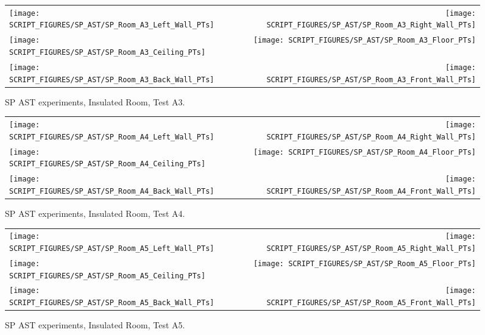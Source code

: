 \begin{figure}[p]
\begin{tabular*}{\textwidth}{l@{\extracolsep{\fill}}r}
\texttt{[image: SCRIPT\_FIGURES/SP\_AST/SP\_Room\_A3\_Left\_Wall\_PTs]} &  \texttt{[image: SCRIPT\_FIGURES/SP\_AST/SP\_Room\_A3\_Right\_Wall\_PTs]}  \\
\texttt{[image: SCRIPT\_FIGURES/SP\_AST/SP\_Room\_A3\_Ceiling\_PTs]}   &  \texttt{[image: SCRIPT\_FIGURES/SP\_AST/SP\_Room\_A3\_Floor\_PTs]}  \\
\texttt{[image: SCRIPT\_FIGURES/SP\_AST/SP\_Room\_A3\_Back\_Wall\_PTs]} &  \texttt{[image: SCRIPT\_FIGURES/SP\_AST/SP\_Room\_A3\_Front\_Wall\_PTs]}
\end{tabular*}
\caption[SP AST experiments, Insulated Room, Test A3]{SP AST experiments, Insulated Room, Test A3.}
\label{SP_Room_A3_PTs}
\end{figure}

\begin{figure}[p]
\begin{tabular*}{\textwidth}{l@{\extracolsep{\fill}}r}
\texttt{[image: SCRIPT\_FIGURES/SP\_AST/SP\_Room\_A4\_Left\_Wall\_PTs]} &  \texttt{[image: SCRIPT\_FIGURES/SP\_AST/SP\_Room\_A4\_Right\_Wall\_PTs]}  \\
\texttt{[image: SCRIPT\_FIGURES/SP\_AST/SP\_Room\_A4\_Ceiling\_PTs]}   &  \texttt{[image: SCRIPT\_FIGURES/SP\_AST/SP\_Room\_A4\_Floor\_PTs]}  \\
\texttt{[image: SCRIPT\_FIGURES/SP\_AST/SP\_Room\_A4\_Back\_Wall\_PTs]} &  \texttt{[image: SCRIPT\_FIGURES/SP\_AST/SP\_Room\_A4\_Front\_Wall\_PTs]}
\end{tabular*}
\caption[SP AST experiments, Insulated Room, Test A4]{SP AST experiments, Insulated Room, Test A4.}
\label{SP_Room_A4_PTs}
\end{figure}

\begin{figure}[p]
\begin{tabular*}{\textwidth}{l@{\extracolsep{\fill}}r}
\texttt{[image: SCRIPT\_FIGURES/SP\_AST/SP\_Room\_A5\_Left\_Wall\_PTs]} &  \texttt{[image: SCRIPT\_FIGURES/SP\_AST/SP\_Room\_A5\_Right\_Wall\_PTs]}  \\
\texttt{[image: SCRIPT\_FIGURES/SP\_AST/SP\_Room\_A5\_Ceiling\_PTs]}   &  \texttt{[image: SCRIPT\_FIGURES/SP\_AST/SP\_Room\_A5\_Floor\_PTs]}  \\
\texttt{[image: SCRIPT\_FIGURES/SP\_AST/SP\_Room\_A5\_Back\_Wall\_PTs]} &  \texttt{[image: SCRIPT\_FIGURES/SP\_AST/SP\_Room\_A5\_Front\_Wall\_PTs]}
\end{tabular*}
\caption[SP AST experiments, Insulated Room, Test A5]{SP AST experiments, Insulated Room, Test A5.}
\label{SP_Room_A5_PTs}
\end{figure}

